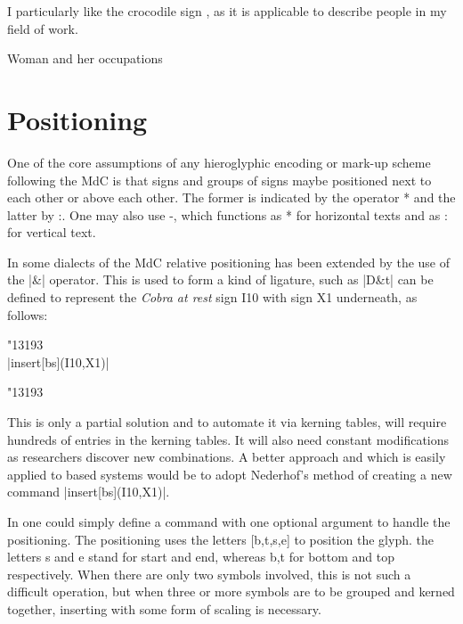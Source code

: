 I particularly like the crocodile sign \def\crocodile{} {\crocodile}, as it is applicable to describe people in my field of work. 

\begin{scriptexample}[]{Woman and her occupations}
\end{scriptexample}

\section{Positioning}

One of the core assumptions of any hieroglyphic encoding or mark-up scheme following the MdC is that signs and groups of signs maybe positioned next to each other or above each other. The former is indicated by the operator * and the latter by :. One may also use -, which functions as * for horizontal texts and as : for vertical text. 

In some dialects of the MdC relative positioning has been extended by the use of the |&| operator. This is used to form a kind of ligature, such as |D&t| can be defined to represent the \textit{Cobra at rest} sign I10 with sign X1 underneath, as follows:

\begin{center}
{\hiero\HUGE
       \mbox{\char"13193\hfill\hfill}\\
       {\large|insert[bs](I10,X1)|}

\mbox{\rlap{\scalebox{0.5}{\char"133E3}}\char"13193\hfill\hfill}\\
 	
}
\end{center}

This is only a partial solution and to automate it via kerning tables, will require hundreds of entries in the kerning tables. It will also need constant modifications as researchers discover new combinations. A better approach and which is easily applied to \tex based systems would be to adopt Nederhof's method of creating a new command |insert[bs](I10,X1)|. 

In \tex one could simply define a command \cmd{\insert} with one optional argument to handle the positioning. The positioning uses the letters [b,t,s,e] to position the glyph. the letters s and e stand for start and end, whereas b,t for bottom and top respectively. When there are only two symbols involved, this is not such a difficult operation, but when three or more symbols are to be grouped and kerned together, inserting with some form of scaling is necessary.


